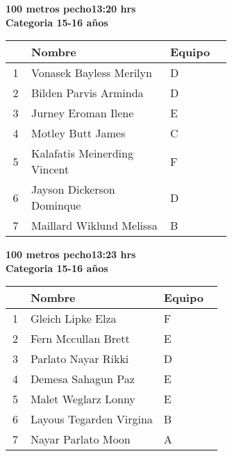 \begin{minipage}{0.95\linewidth}\vspace{0.5cm} 
\begin{flushleft}
\textbf{
\hspace{-0.15cm}100 metros pecho\hspace{1.5cm}13:20 hrs \\Categoria 15-16 años}\vspace{-0.2cm} 
\end{flushleft}
\begin{tabular}{cp{0.63\linewidth}l}
\hline
& \textbf{Nombre} & \textbf{Equipo} \\ \hline
1 & Vonasek Bayless Merilyn & D \\ 
2 & Bilden Parvis Arminda & D \\ 
3 & Jurney Eroman Ilene & E \\ 
4 & Motley Butt James & C \\ 
5 & Kalafatis Meinerding Vincent & F \\ 
6 & Jayson Dickerson Dominque & D \\ 
7 & Maillard Wiklund Melissa & B \\ 
\end{tabular}
\end{minipage}
\begin{minipage}{0.95\linewidth}\vspace{0.5cm} 
\begin{flushleft}
\textbf{
\hspace{-0.15cm}100 metros pecho\hspace{1.5cm}13:23 hrs \\Categoria 15-16 años}\vspace{-0.2cm} 
\end{flushleft}
\begin{tabular}{cp{0.63\linewidth}l}
\hline
& \textbf{Nombre} & \textbf{Equipo} \\ \hline
1 & Gleich Lipke Elza & F \\ 
2 & Fern Mccullan Brett & E \\ 
3 & Parlato Nayar Rikki & D \\ 
4 & Demesa Sahagun Paz & E \\ 
5 & Malet Weglarz Lonny & E \\ 
6 & Layous Tegarden Virgina & B \\ 
7 & Nayar Parlato Moon & A \\ 
\end{tabular}
\end{minipage}
